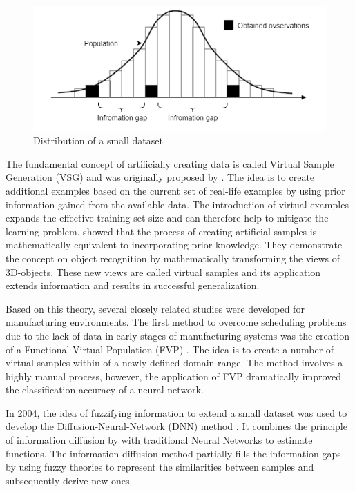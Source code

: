 \documentclass[parskip=full]{scrartcl}
\begin{document}
\begin{figure}[H]
	\centering
	\includegraphics[width=0.6\linewidth]{"./resources/small_data_distribution"}
	\caption{Distribution of a small dataset \cite{Tsai.2015}}
	\label{fig:small-data-distribution}
\end{figure}

The fundamental concept of artificially creating data is called Virtual Sample Generation (VSG) and was 
originally proposed by \cite{Niyogi.1998}. The idea is to create additional examples based on the 
current set of real-life examples by using prior information gained from the available data. The 
introduction of virtual examples expands the effective training set size and can therefore help to 
mitigate the learning problem. \cite{Niyogi.1998} showed that the process of creating artificial samples 
is mathematically equivalent to incorporating prior knowledge. They demonstrate the concept on object 
recognition by mathematically transforming the views of 3D-objects. These new views are called virtual 
samples and its application extends information and results in successful generalization. 

Based on this theory, several closely related studies were developed for manufacturing environments. 
The first method to overcome scheduling problems due to the lack of data in early stages of 
manufacturing systems was the creation of a Functional Virtual Population (FVP) \cite{Li.2003}. The 
idea is to create a number of virtual samples within of a newly defined domain range. The method 
involves a highly manual process, however, the application of FVP dramatically improved the 
classification accuracy of a neural network. 

In 2004, the idea of fuzzifying information to extend a small dataset was used to develop the 
Diffusion-Neural-Network (DNN) method \cite{Huang.2004}. It combines the principle of information 
diffusion by \cite{Huang.1997} with  traditional Neural Networks to estimate functions. The information 
diffusion method partially fills the information gaps by using fuzzy theories to represent the similarities 
between samples and subsequently derive new ones. 
\end{document}
